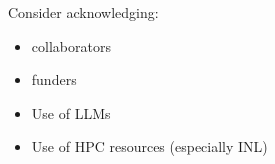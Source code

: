 \documentclass[../main.tex]{subfiles}
\begin{document}
Consider acknowledging:

\begin{itemize}
  \item collaborators
  \item funders
  \item Use of LLMs
  \item Use of HPC resources (especially INL)
\end{itemize}
\end{document}
